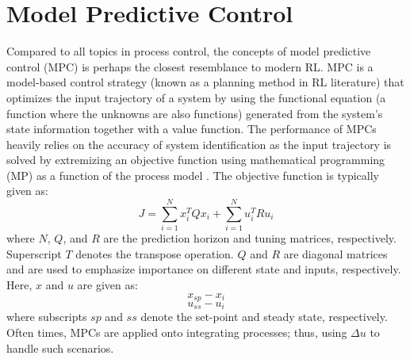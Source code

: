 %
%
%
%

\section{Model Predictive Control}

Compared to all topics in process control, the concepts of model predictive control (MPC) is perhaps the closest resemblance to modern RL.  MPC is a model-based control strategy (known as a planning method in RL literature) that optimizes the input trajectory of a system by using the functional equation (a function where the unknowns are also functions) generated from the system's state information together with a value function. The performance of MPCs heavily relies on the accuracy of system identification as the input trajectory is solved by extremizing an objective function using mathematical programming (MP) as a function of the process model \cite{mpc}. The objective function is typically given as:
\begin{equation}
    J = \sum\limits^{N}_{i = 1} x_i^TQx_i + \sum\limits^N_{i=1}u_i^TRu_i
    \label{eq:mpc_cost}
\end{equation}
where $N$, $Q$, and $R$ are the prediction horizon and tuning matrices, respectively. Superscript $T$ denotes the transpose operation. $Q$ and $R$ are diagonal matrices and are used to emphasize importance on different state and inputs, respectively. Here, $x$ and $u$ are given as:
\begin{equation}
    x_{sp} - x_i
\end{equation}
\begin{equation}
    u_{ss} - u_i
\end{equation}
where subscripts $sp$ and $ss$ denote the set-point and steady state, respectively. Often times, MPCs are applied onto integrating processes; thus, using $\Delta u$ to handle such scenarios.

